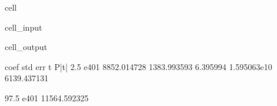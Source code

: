 \documentclass[letterpaper,10pt,english]{jupyterBook}
\begin{document}
\begin{sphinxuseclass}{cell}
\begin{sphinxVerbatimInput}
\begin{sphinxuseclass}{cell_input}
\end{sphinxuseclass}\end{sphinxVerbatimInput}
\begin{sphinxVerbatimOutput}

\begin{sphinxuseclass}{cell_output}
\begin{sphinxVerbatim}[commandchars=\\\{\}]
             coef      std err         t         P\PYGZgt{}|t|        2.5 \PYGZpc{}  \PYGZbs{}
e401  8852.014728  1383.993593  6.395994  1.595063e\PYGZhy{}10  6139.437131   

            97.5 \PYGZpc{}  
e401  11564.592325  
\end{sphinxVerbatim}

\end{sphinxuseclass}\end{sphinxVerbatimOutput}

\end{sphinxuseclass}
\end{document}
